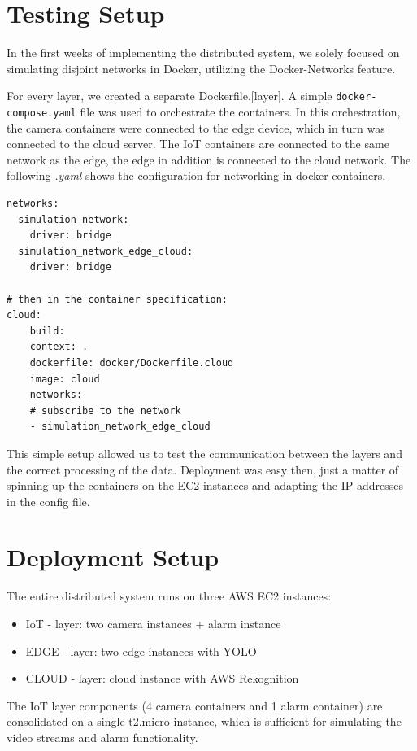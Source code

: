 \documentclass[conference]{IEEEtran}
\begin{document}
\section{Testing Setup}
In the first weeks of implementing the distributed system, we solely focused on simulating disjoint networks in Docker, utilizing the Docker-Networks feature. 

For every layer, we created a separate Dockerfile.[layer]. A simple \texttt{docker-compose.yaml} file was used to orchestrate the containers. In this orchestration, the camera containers were connected to the edge device, which in turn was connected to the cloud server. 
The IoT containers are connected to the same network as the edge, the edge in addition is connected to the cloud network. 
The following \textit{.yaml} shows the configuration for networking in docker containers.

\begin{verbatim}
networks:
  simulation_network:
    driver: bridge
  simulation_network_edge_cloud:
    driver: bridge

# then in the container specification: 
cloud: 
    build:
    context: .
    dockerfile: docker/Dockerfile.cloud
    image: cloud
    networks:
    # subscribe to the network
    - simulation_network_edge_cloud 
\end{verbatim}

This simple setup allowed us to test the communication between the layers and the correct processing of the data. 
Deployment was easy then, just a matter of spinning up the containers on the EC2 instances and adapting the IP addresses in the config file.

\section{Deployment Setup}
The entire distributed system runs on three AWS EC2 instances:
\begin{itemize}
    \item IoT - layer: two camera instances + alarm instance
    \item EDGE - layer: two edge instances with YOLO
    \item CLOUD - layer: cloud instance with AWS Rekognition
\end{itemize}

\hfill \break

The IoT layer components (4 camera containers and 1 alarm container) are consolidated on a single t2.micro instance, which is sufficient for simulating the video streams and alarm functionality.
\end{document}
